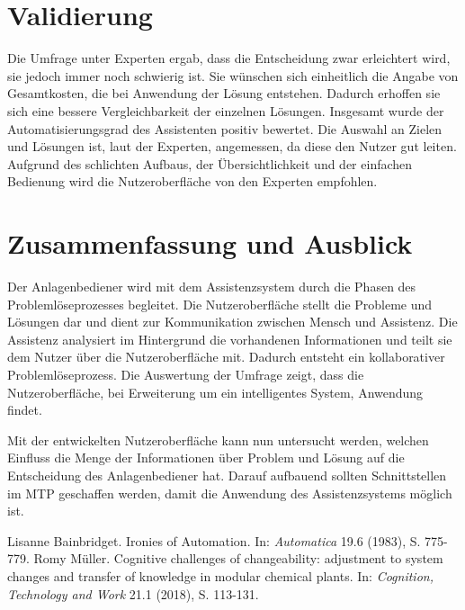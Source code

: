 \documentclass{ifaPoster}
\begin{document}
\section{Validierung}
Die Umfrage unter Experten ergab, dass die Entscheidung zwar erleichtert wird, sie jedoch immer noch schwierig ist.
Sie wünschen sich einheitlich die Angabe von Gesamtkosten, die bei Anwendung der Lösung entstehen. Dadurch erhoffen sie sich eine bessere Vergleichbarkeit der einzelnen Lösungen. Insgesamt wurde der Automatisierungsgrad des Assistenten positiv bewertet. Die Auswahl an Zielen und Lösungen ist, laut der Experten, angemessen, da diese den Nutzer gut leiten. Aufgrund des schlichten Aufbaus, der Übersichtlichkeit und der einfachen Bedienung wird die Nutzeroberfläche von den Experten empfohlen. 


\section{Zusammenfassung und Ausblick}
Der Anlagenbediener wird mit dem Assistenzsystem durch die Phasen des Problemlöseprozesses begleitet. Die Nutzeroberfläche stellt die Probleme und Lösungen dar und dient zur Kommunikation zwischen Mensch und Assistenz. Die Assistenz analysiert im Hintergrund die vorhandenen Informationen und teilt sie dem Nutzer über die Nutzeroberfläche mit. Dadurch entsteht ein kollaborativer Problemlöseprozess. Die Auswertung der Umfrage zeigt, dass die Nutzeroberfläche, bei Erweiterung um ein intelligentes System, Anwendung findet.

Mit der entwickelten Nutzeroberfläche kann nun untersucht werden, welchen Einfluss die Menge der Informationen über Problem und Lösung auf die Entscheidung des Anlagenbediener hat. Darauf aufbauend sollten Schnittstellen im MTP geschaffen werden, damit die Anwendung des Assistenzsystems möglich ist.

 {\tiny\renewcommand{\section}[2]{}%
 	 \begin{thebibliography}{8.5}
 	 	Lisanne Bainbridget. {\glqq Ironies of Automation\grqq}. {In: \textit{Automatica}} 19.6 (1983), S. 775-779.
 	 Romy Müller. {\glqq Cognitive challenges of changeability: adjustment
to system changes and transfer of knowledge in modular
chemical plants\grqq}. {In: \textit{Cognition, Technology and Work}} 21.1 (2018), S. 113-131.
	\end{thebibliography}}
	
\end{document}
